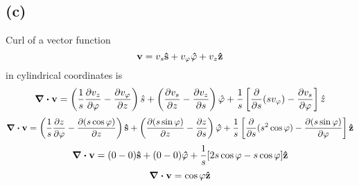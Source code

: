\subsection*{(c)}
Curl of a vector function 
\[\vb{v}=v_s\vu{s}+v_{\varphi}\vu{\varphi}+v_z\vu{z}\]  in cylindrical coordinates is \[\div{\vb{v}}=\left(\frac{1}{s}\frac{\partial{v_z}}{\partial{\varphi}}-\frac{\partial{v_{\varphi}}}{\partial{z}} \right )\hat{s}+\left(\frac{\partial{v_s}}{\partial{z}}-\frac{\partial{v_{z}}}{\partial{s}} \right )\hat{\varphi}+\frac{1}{s}\left[ \frac{\partial}{\partial{s}}(s{v_{\varphi}})-\frac{\partial{v_s}}{\partial{\varphi}}\right ]\hat{z}\]
\[\div{\vb{v}}=\left(\frac{1}{s}\frac{\partial{z}}{\partial{\varphi}}-\frac{\partial{(s\cos{\varphi})}}{\partial{z}} \right )\vu{s}+\left(\frac{\partial{(s\sin{\varphi})}}{\partial{z}}-\frac{\partial{z}}{\partial{s}} \right )\vu{\varphi}+\frac{1}{s}\left[ \frac{\partial}{\partial{s}}(s^2\cos{\varphi})-\frac{\partial{(s\sin{\varphi})}}{\partial{\varphi}}\right ]\vu{z}\]
\[\div{\vb{v}}=(0-0)\vu{s}+(0-0)\vu{\varphi}+\frac{1}{s}[ 2s\cos{\varphi}-s\cos{\varphi} ]\vu{z}\]
\[\div{\vb{v}}=\cos{\varphi}\vu{z}\]